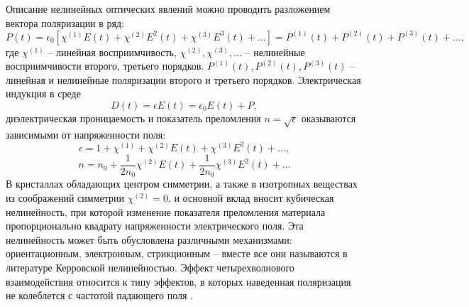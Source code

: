Описание нелинейных оптических явлений можно проводить разложением вектора поляризации в ряд:
%
\begin{equation}
P(t)=\epsilon_0[\chi^{(1)}E(t)+\chi^{(2)}E^2(t)+\chi^{(3)}E^3(t)+\dots] =P^{(1)}(t)+P^{(2)}(t)+P^{(3)}(t)+\dots,
\end{equation}
%
где $\chi^{(1)}$ -- линейная восприимчивость, $\chi^{(2)},\chi^{(3)},\dots$ -- нелинейные восприимчивости второго, третьего порядков. $P^{(1)}(t),P^{(2)}(t),P^{(3)}(t)$ -- линейная и нелинейные поляризации второго и третьего порядков. Электрическая индукция в среде
%
\begin{equation}
D(t)=\epsilon E(t)=\epsilon_0E(t)+P,
\end{equation}
%
диэлектрическая проницаемость и показатель преломления $n=\sqrt{\epsilon}$ оказываются зависимыми от напряженности поля:
%
\begin{equation}
\epsilon=1+\chi^{(1)}+\chi^{(2)}E(t)+\chi^{(3)}E^2(t)+\dots,
\end{equation}
\begin{equation}
n=n_0+\frac{1}{2n_0}\chi^{(2)}E(t)+\frac{1}{2n_0}\chi^{(3)}E^2(t)+\dots
\end{equation}
%
В кристаллах обладающих центром симметрии, а также в изотропных веществах из соображений симметрии $\chi^{(2)}=0$, и основной вклад вносит кубическая нелинейность, при которой изменение показателя преломления материала пропорционально квадрату напряженности электрического поля. Эта нелинейность может быть обусловлена различными механизмами: ориентационным, электронным, стрикционным -- вместе все они называются в литературе Керровской нелинейностью. Эффект четырехволнового взаимодействия относится к типу эффектов, в которых наведенная поляризация не колеблется с частотой падающего поля \cite{Gorodetsky}.

